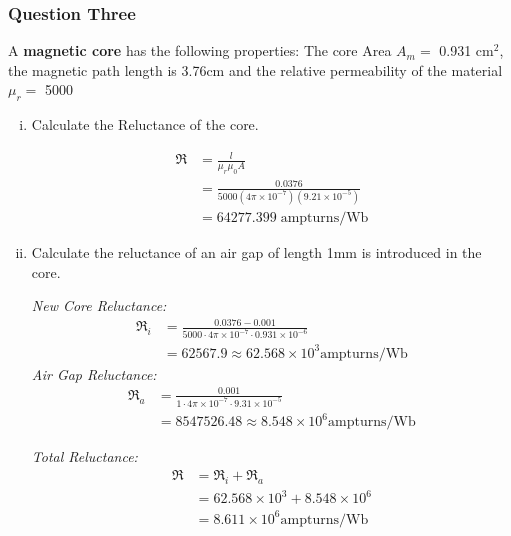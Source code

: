 \documentclass[a4paper,11pt]{article}
\begin{document}
\newpage
\subsubsection*{Question Three}
A \textbf{magnetic core} has the following properties: The core Area $A_m = $ 0.931 cm$^2$, the magnetic path length is 3.76cm and the relative permeability of the material $\mu_r = $ 5000

\begin{enumerate}[i.]
    \item Calculate the Reluctance of the core.

          \begin{align*}
              \mathfrak{R} & = \frac{l}{\mu_{r}\mu_{0}A}                                 \\
                           & = \frac{0.0376}{5000(4\pi\times10^{-7})(9.21\times10^{-5})} \\
                           & = 64277.399 \; \mathrm{ampturns/Wb}
          \end{align*}

    \item Calculate the reluctance of an air gap of length 1mm is introduced in the core.

          \textit{New Core Reluctance:}
          \begin{align*}
              \mathfrak{R}_i & = \frac{0.0376 - 0.001}{5000\cdot 4\pi\times10^{-7}\cdot 0.931\times 10^{-6}} \\
                             & = 62567.9 \approx 62.568\times 10^3 \mathrm{ampturns/Wb}
          \end{align*}
          \textit{Air Gap Reluctance:}
          \begin{align*}
              \mathfrak{R}_a & = \frac{0.001}{1\cdot 4\pi\times10^{-7}\cdot 9.31\times 10^{-5}} \\
                             & = 8547526.48 \approx 8.548\times 10^6 \mathrm{ampturns/Wb}
          \end{align*}

          \textit{Total Reluctance:}
          \begin{align*}
              \mathfrak{R} & = \mathfrak{R}_i + \mathfrak{R}_a       \\
                           & = 62.568\times 10^3 + 8.548\times 10^6  \\
                           & = 8.611\times 10^6 \mathrm{ampturns/Wb}
          \end{align*}


\end{enumerate}
\end{document}
